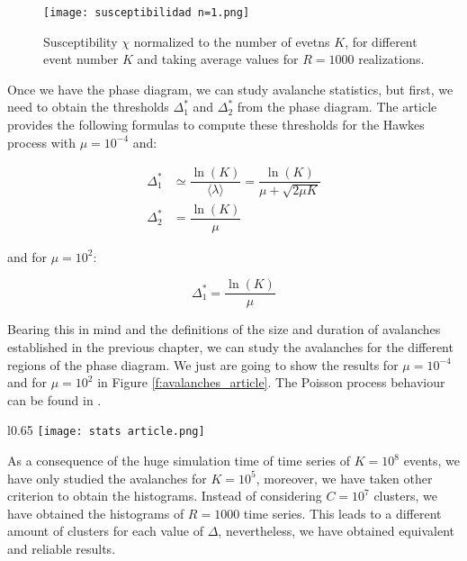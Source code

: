 \begin{figure}[H]
    \centering
    \texttt{[image: susceptibilidad n=1.png]}
    \caption{Susceptibility $\chi$ normalized to the number of evetns $K$, for different event number $K$ and taking average values for $R=1000$ realizations.}
    \label{f:susceptibilidad_article}   
\end{figure}

Once we have the phase diagram, we can study avalanche statistics, but first, we need to obtain the thresholds $\Delta_1^*$ and $\Delta_2^*$ from the phase diagram. 
The article \cite{notarmuzi2021percolation} provides the following formulas to compute these thresholds for the Hawkes process with $\mu=10^{-4}$ and:

\begin{align}
    \Delta_1^* &\simeq \dfrac{\ln(K)}{\langle \lambda \rangle}= \dfrac{\ln(K)}{\mu+\sqrt{2\mu K}} \label{eq:Ecuación delta1 *} \\
    \Delta_2^* &= \dfrac{\ln(K)}{\mu}\label{eq:Ecuación delta2 *}
\end{align}

and for $\mu=10^2$:

\begin{equation}
    \Delta_1^* = \dfrac{\ln(K)}{\mu}
\end{equation}

Bearing this in mind and the definitions of the size and duration of avalanches established in the previous chapter, we can study the avalanches for the different regions
of the phase diagram. We just are going to show the results for $\mu=10^{-4}$ and for $\mu=10^2$ in Figure \ref{f:avalanches_article}. The Poisson process behaviour can be found in 
\cite{stauffer2018introduction, stauffer1978critical}. 


\begin{wrapfigure}{l}{0.65\textwidth}
      \texttt{[image: stats article.png]}
    \caption{Avalanche analysis for Hawkes process with $n=1$, $K=10^5$ events. The histograms have been calculated over $R=1000$ time series.}
    \label{f:avalanches_article}
\end{wrapfigure}

As a consequence of the huge simulation time of time series of $K=10^8$ events, we have only studied the avalanches for $K=10^5$, moreover, we have taken other criterion to obtain the 
histograms. Instead of considering $C=10^7$ clusters, we have obtained the histograms of $R=1000$ time series. This leads to a different amount of clusters for each value of $\Delta$, 
nevertheless, we have obtained equivalent and reliable results.  

